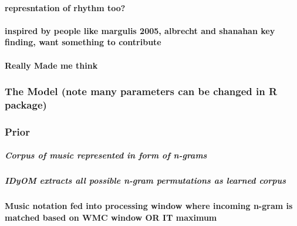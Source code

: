 \documentclass[]{book}
\let\oldparagraph\paragraph
\renewcommand{\paragraph}[1]{\oldparagraph{#1}\mbox{}}
\let\oldsubparagraph\subparagraph
\renewcommand{\subparagraph}[1]{\oldsubparagraph{#1}\mbox{}}
\theoremstyle{definition}
\theoremstyle{definition}
\theoremstyle{definition}
\theoremstyle{remark}
\begin{document}
\hypertarget{represntation-of-rhythm-too}{%
\paragraph{represntation of rhythm
too?}\label{represntation-of-rhythm-too}}

\hypertarget{inspired-by-people-like-margulis-2005-albrecht-and-shanahan-key-finding-want-something-to-contribute}{%
\paragraph{inspired by people like margulis 2005, albrecht and shanahan
key finding, want something to
contribute}\label{inspired-by-people-like-margulis-2005-albrecht-and-shanahan-key-finding-want-something-to-contribute}}

\hypertarget{really-made-me-think}{%
\paragraph{Really Made me think}\label{really-made-me-think}}

\hypertarget{the-model-note-many-parameters-can-be-changed-in-r-package}{%
\subsubsection{The Model (note many parameters can be changed in R
package)}\label{the-model-note-many-parameters-can-be-changed-in-r-package}}

\hypertarget{prior}{%
\subsubsection{Prior}\label{prior}}

\hypertarget{corpus-of-music-represented-in-form-of-n-grams}{%
\subparagraph{Corpus of music represented in form of
n-grams}\label{corpus-of-music-represented-in-form-of-n-grams}}

\hypertarget{idyom-extracts-all-possible-n-gram-permutations-as-learned-corpus}{%
\subparagraph{IDyOM extracts all possible n-gram permutations as learned
corpus}\label{idyom-extracts-all-possible-n-gram-permutations-as-learned-corpus}}

\hypertarget{music-notation-fed-into-processing-window-where-incoming-n-gram-is-matched-based-on-wmc-window-or-it-maximum}{%
\paragraph{Music notation fed into processing window where incoming
n-gram is matched based on WMC window OR IT
maximum}\label{music-notation-fed-into-processing-window-where-incoming-n-gram-is-matched-based-on-wmc-window-or-it-maximum}}
\end{document}
